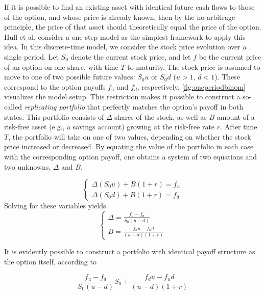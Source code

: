\documentclass[english,12pt,a4paper,pdftex,sci,utf8]{aaltothesis}
\begin{document}
If it is possible to find an existing asset with identical future cash flows to those of the option, and whose price is already known, then by the no-arbitrage principle, the price of that asset should theoretically equal the price of the option. Hull et al. \cite{hull2013fundamentals} consider a one-step model as the simplest framework to apply this idea. In this discrete-time model, we consider the stock price evolution over a single period. Let $S_0$ denote the current stock price, and let $f$ be the current price of an option on one share, with time $T$ to maturity. The stock price is assumed to move to one of two possible future values: $S_0u$ or $S_0d$ ($u>1$, $d<1$). These correspond to the option payoffs $f_u$ and $f_d$, respectively. \cref{fig:oneperiodbinom} visualizes the model setup. This restriction makes it possible to construct a so-called \emph{replicating portfolio} that perfectly matches the option's payoff in both states. This portfolio consists of $\Delta$ shares of the stock, as well as $B$ amount of a risk-free asset (e.g., a savings account) growing at the risk-free rate $r$. After time $T$, the portfolio will take on one of two values, depending on whether the stock price increased or decreased. By equating the value of the portfolio in each case with the corresponding option payoff, one obtains a system of two equations and two unknowns, $\Delta$ and $B$.

\begin{equation*}
\begin{cases}
    \Delta (S_0u) + B(1+r) = f_u\\
    \Delta (S_0d) + B(1+r) = f_d
\end{cases}
\end{equation*}
Solving for these variables yields
\begin{equation*}
\begin{cases}
    \Delta = \frac{f_u - f_d}{S_0(u-d)}\\
    B = \frac{f_du-f_ud}{(u-d)(1+r)}
\end{cases}
\end{equation*}

It is evidently possible to construct a portfolio with identical payoff structure as the option itself, according to

\begin{equation}
     \frac{f_u - f_d}{S_0(u-d)} S_0 + \frac{f_du-f_ud}{(u-d)(1+r)}
\label{eq:replicating-portfolio}
\end{equation}
\end{document}

